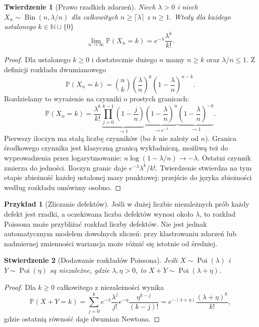 \documentclass[11pt,a4paper,oneside]{report}
\numberwithin{equation}{chapter}
\theoremstyle{plain}
\newtheorem{twierdzenie}{Twierdzenie}[chapter]
\newtheorem{stwierdzenie}[twierdzenie]{Stwierdzenie}
\theoremstyle{definition}
\newtheorem{przyklad}{Przykład}[chapter]
\theoremstyle{remark}
\newcommand{\N}{\mathbb{N}}
\newcommand{\Prob}{\mathbb{P}}
\newcommand{\Bin}{\operatorname{Bin}}
\newcommand{\Poi}{\operatorname{Poi}}
\begin{document}
\begin{twierdzenie}[Prawo rzadkich zdarzeń]
Niech $\lambda>0$ i niech $X_n\sim\Bin(n,\lambda/n)$
dla całkowitych $n\geq\lceil\lambda\rceil$ z $n\geq1$.
Wtedy dla każdego ustalonego $k\in\N\cup\{0\}$
\[
\lim_{n\to\infty}\Prob(X_n=k)
=e^{-\lambda}\frac{\lambda^k}{k!}.
\]
\end{twierdzenie}
\begin{proof}
Dla ustalonego $k\geq0$ i dostatecznie dużego $n$
mamy $n\geq k$ oraz $\lambda/n\leq1$. Z definicji
rozkładu dwumianowego
\[
\Prob(X_n=k)=\binom nk\left(\frac\lambda n\right)^k
\left(1-\frac\lambda n\right)^{n-k}.
\]
Rozdzielamy to wyrażenie na czynniki o prostych granicach:
\[
\Prob(X_n=k)=\frac{\lambda^k}{k!}
\underbrace{\prod_{j=0}^{k-1}\left(1-\frac jn\right)}_{\longrightarrow1}
\underbrace{\left(1-\frac\lambda n\right)^n}_{\longrightarrow e^{-\lambda}}
\underbrace{\left(1-\frac\lambda n\right)^{-k}}_{\longrightarrow1}.
\]
Pierwszy iloczyn ma stałą liczbę czynników (bo $k$ nie
zależy od $n$). Granica środkowego czynnika jest
klasyczną granicą wykładniczą, możliwą też do
wyprowadzenia przez logarytmowanie:
$n\log(1-\lambda/n)\to-\lambda$.
Ostatni czynnik zmierza do jedności.
Iloczyn granic daje $e^{-\lambda}\lambda^k/k!$.
Twierdzenie stwierdza na tym etapie zbieżność
każdej ustalonej masy punktowej; przejście do
języka zbieżności według rozkładu omówimy osobno.
\end{proof}

\begin{przyklad}[Zliczanie defektów]
Jeśli w dużej liczbie niezależnych prób każdy defekt jest rzadki,
a oczekiwana liczba defektów wynosi około $\lambda$, to rozkład
Poissona może przybliżać rozkład liczby defektów.
Nie jest jednak automatycznym modelem dowolnych zliczeń:
przy klastrowaniu zdarzeń lub nadmiernej zmienności
wariancja może różnić się istotnie od średniej.
\end{przyklad}

\begin{stwierdzenie}[Dodawanie rozkładów Poissona]
Jeśli $X\sim\Poi(\lambda)$ i $Y\sim\Poi(\eta)$ są niezależne,
gdzie $\lambda,\eta>0$, to $X+Y\sim\Poi(\lambda+\eta)$.
\end{stwierdzenie}
\begin{proof}
Dla $k\geq0$ całkowitego z niezależności wynika
\[
\Prob(X+Y=k)
=\sum_{j=0}^k e^{-\lambda}\frac{\lambda^j}{j!}
 e^{-\eta}\frac{\eta^{k-j}}{(k-j)!}
=e^{-(\lambda+\eta)}\frac{(\lambda+\eta)^k}{k!},
\]
gdzie ostatnią równość daje dwumian Newtona.
\end{proof}
\end{document}
